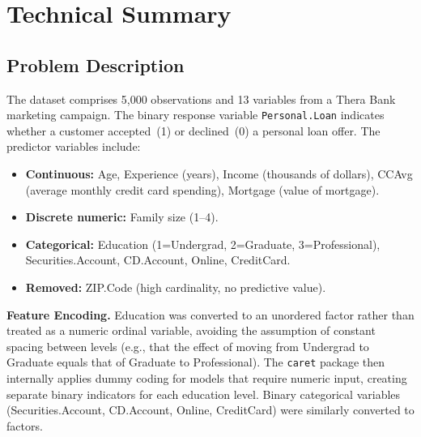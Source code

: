 \section{Technical Summary}\label{sec:technical}

\subsection{Problem Description}\label{sec:problem}

The dataset comprises 5,000 observations and 13 variables from a Thera Bank marketing campaign. The binary response variable \texttt{Personal.Loan} indicates whether a customer accepted~(1) or declined~(0) a personal loan offer. The predictor variables include:

\begin{itemize}
    \item \textbf{Continuous:} Age, Experience (years), Income (thousands of dollars), CCAvg (average monthly credit card spending), Mortgage (value of mortgage).
    \item \textbf{Discrete numeric:} Family size (1--4).
    \item \textbf{Categorical:} Education (1=Undergrad, 2=Graduate, 3=Professional), Securities.Account, CD.Account, Online, CreditCard.
    \item \textbf{Removed:} ZIP.Code (high cardinality, no predictive value).
\end{itemize}

\noindent\textbf{Feature Encoding.}
Education was converted to an unordered factor rather than treated as a numeric ordinal variable, avoiding the assumption of constant spacing between levels (e.g., that the effect of moving from Undergrad to Graduate equals that of Graduate to Professional). The \texttt{caret} package then internally applies dummy coding for models that require numeric input, creating separate binary indicators for each education level. Binary categorical variables (Securities.Account, CD.Account, Online, CreditCard) were similarly converted to factors.

